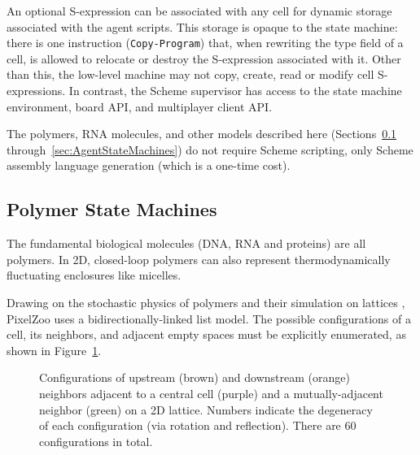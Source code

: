 \documentclass{acm_proc_article-sp}
\begin{document}
An optional S-expression can be associated with any cell for dynamic storage associated with the agent scripts.
This storage is opaque to the state machine: there is one instruction ({\tt Copy-Program}) that, when rewriting the type field of a cell, is allowed to relocate or destroy the S-expression associated with it.
Other than this, the low-level machine may not copy, create, read or modify cell S-expressions.
In contrast, the Scheme supervisor has access to the state machine environment, board API, and multiplayer client API.

The polymers, RNA molecules, and other models described here
 (Sections~\ref{sec:PolymerStateMachines} through~\ref{sec:AgentStateMachines})
 do not require Scheme scripting, only Scheme assembly language generation (which is a one-time cost).

\subsection{Polymer State Machines}
\label{sec:PolymerStateMachines}

The fundamental biological molecules (DNA, RNA and proteins) are all polymers.
In 2D, closed-loop polymers can also represent thermodynamically fluctuating enclosures like micelles.

Drawing on the stochastic physics of polymers \cite{DoiEdwards1988}
and their simulation on lattices \cite{PhysRevLett.64.1915,journals/pc/OstrovskyCSB01},
PixelZoo uses a bidirectionally-linked list model.
The possible configurations of a cell, its neighbors, and adjacent empty spaces must
be explicitly enumerated, as shown in Figure~\ref{fig:polymer}.

\begin{figure}
\caption{
\label{fig:polymer}
Configurations of upstream (brown) and downstream (orange) neighbors adjacent to a central cell (purple) and a mutually-adjacent neighbor (green) on a 2D lattice.
Numbers indicate the degeneracy of each configuration (via rotation and reflection).
There are 60 configurations in total.
}
\end{figure}
\end{document}

